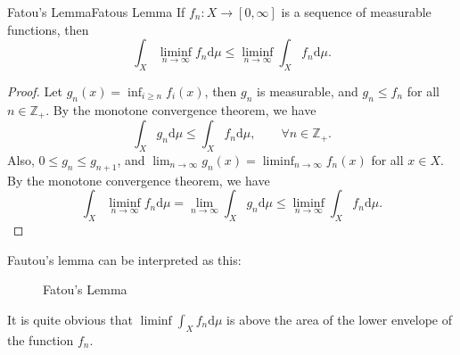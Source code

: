\documentclass[../main.tex]{subfiles}
\begin{document}
\begin{lemma}{Fatou's Lemma}{Fatous Lemma}
	If $f_n: X \rightarrow [0,\infty ]$ is a sequence of measurable functions, then
	\begin{equation}
	\int_X \liminf_{n\rightarrow \infty } f_n \mathrm{d} \mu \leq \liminf_{n\rightarrow \infty } \int_X f_n \mathrm{d} \mu.
	\end{equation}
\end{lemma}
\begin{proof}
	Let $g_n(x) = \inf_{i\geq n}f_i(x)$, then $g_n$ is measurable, and $g_n \leq f_n$ for all $n\in \mathbb{Z}_+$. By the monotone convergence theorem, we have
	\begin{equation*}
		\int_X g_n \mathrm{d} \mu \leq \int_X f_n \mathrm{d} \mu, \qquad \forall n\in \mathbb{Z}_+.
	\end{equation*}
	Also, $0\leq g_n \leq g_{n+1}$, and $\lim_{n\rightarrow \infty } g_n(x) = \liminf_{n\rightarrow \infty } f_n(x)$ for all $x\in X$. By the monotone convergence theorem, we have
	\begin{equation*}
		\int_X \liminf_{n\rightarrow \infty } f_n \mathrm{d} \mu = \lim_{n\rightarrow \infty } \int_X g_n \mathrm{d} \mu \leq \liminf_{n\rightarrow \infty } \int_X f_n \mathrm{d} \mu.
	\end{equation*}
\end{proof}

Fautou's lemma can be interpreted as this:

\begin{figure}[ht]
    \centering
    \caption{Fatou's Lemma}
    \label{fig:fatou's-lemma}
\end{figure}
It is quite obvious that $\liminf \int_X f_n \mathrm{d} \mu$ is above the area of the lower envelope of the function $f_n$.
\end{document}
